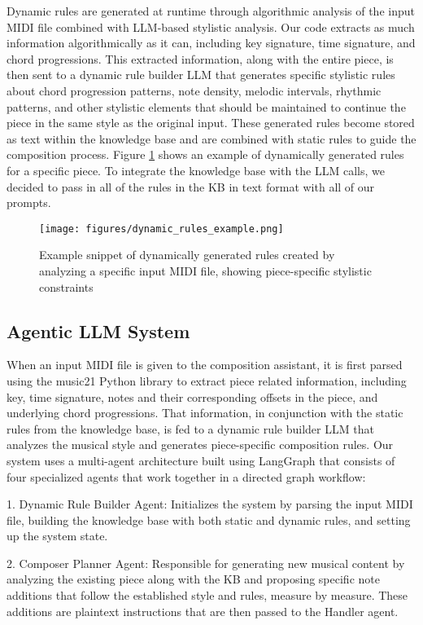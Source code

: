 \documentclass[conference]{IEEEtran}
\begin{document}
Dynamic rules are generated at runtime through algorithmic analysis of the input MIDI file combined with LLM-based stylistic analysis. Our code extracts as much information algorithmically as it can, including key signature, time signature, and chord progressions. This extracted information, along with the entire piece, is then sent to a dynamic rule builder LLM that generates specific stylistic rules about chord progression patterns, note density, melodic intervals, rhythmic patterns, and other stylistic elements that should be maintained to continue the piece in the same style as the original input. These generated rules become stored as text within the knowledge base and are combined with static rules to guide the composition process. Figure \ref{fig:dynamic_rules} shows an example of dynamically generated rules for a specific piece. To integrate the knowledge base with the LLM calls, we decided to pass in all of the rules in the KB in text format with all of our prompts.

\begin{figure}[htbp]
\centering
\texttt{[image: figures/dynamic\_rules\_example.png]}
\caption{Example snippet of dynamically generated rules created by analyzing a specific input MIDI file, showing piece-specific stylistic constraints}
\label{fig:dynamic_rules}
\end{figure} 

\subsection{Agentic LLM System}

When an input MIDI file is given to the composition assistant, it is first parsed using the music21 Python library to extract piece related information, including key, time signature, notes and their corresponding offsets in the piece, and underlying chord progressions. That information, in conjunction with the static rules from the knowledge base, is fed to a dynamic rule builder LLM that analyzes the musical style and generates piece-specific composition rules. 
Our system uses a multi-agent architecture built using LangGraph that consists of four specialized agents that work together in a directed graph workflow:

1. Dynamic Rule Builder Agent: Initializes the system by parsing the input MIDI file, building the knowledge base with both static and dynamic rules, and setting up the system state. 

2. Composer Planner Agent: Responsible for generating new musical content by analyzing the existing piece along with the KB and proposing specific note additions that follow the established style and rules, measure by measure. These additions are plaintext instructions that are then passed to the Handler agent. 
\end{document}
